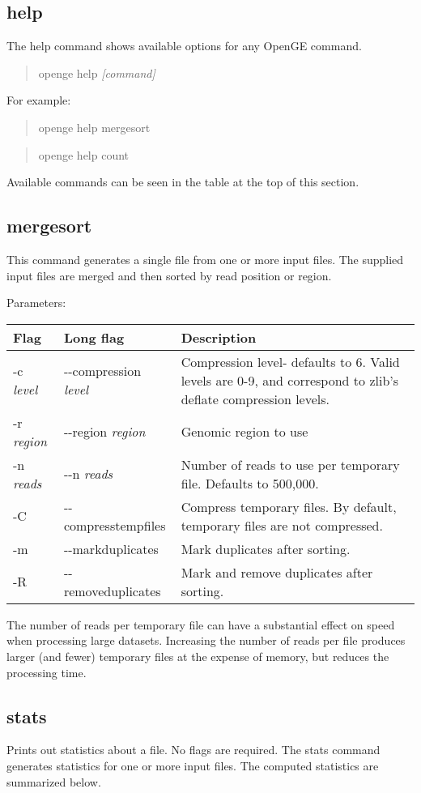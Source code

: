 \documentclass[11pt]{article}
\newcommand {\cmd}[1] {\begin{quote}#1\end{quote}}
\begin{document}
\subsection {help}
The help command shows available options for any OpenGE command. 

\cmd{openge help \textit{[command]}}

For example:

\cmd{openge help mergesort}

\cmd{openge help count}

Available commands can be seen in the table at the top of this section.


\subsection {mergesort}
This command generates a single file from one or more input files. The supplied input files are merged and then sorted by read position or region.

Parameters:
\begin{center}
\begin{tabular}{llp{3.5in}}
\hline
Flag&Long flag&Description\\ \hline
-c \textit{level}&{-}{-}compression \textit{level}&Compression level- defaults to 6. Valid levels are 0-9, and correspond to zlib's deflate compression levels. \\
-r \textit{region}&{-}{-}region \textit{region}&Genomic region to use\\
-n \textit{reads}&{-}{-}n \textit{reads}&Number of reads to use per temporary file. Defaults to 500,000.\\
-C&{-}{-}compresstempfiles&Compress temporary files. By default, temporary files are not compressed.\\
-m&{-}{-}markduplicates&Mark duplicates after sorting.\\
-R&{-}{-}removeduplicates&Mark and remove duplicates after sorting.\\
\end{tabular}
\end{center}

The number of reads per temporary file can have a substantial effect on speed when processing large datasets. Increasing the number of reads per file produces larger (and fewer) temporary files at the expense of memory, but reduces the processing time.

\subsection{stats}
Prints out statistics about a file. No flags are required.
The stats command generates statistics for one or more input files. The computed statistics are summarized below.
\end{document}
